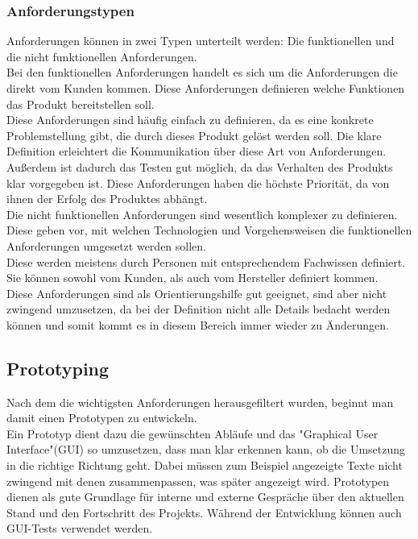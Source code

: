 \documentclass[a4paper,12pt,top=2.5cm,bottom=2.5cm, left=2.5cm, right=2.5cm, numbers=noenddot]{scrartcl}
\begin{document}
\subsubsection{Anforderungstypen}
Anforderungen können in zwei Typen unterteilt werden: Die funktionellen und die nicht funktionellen Anforderungen.
\\Bei den funktionellen Anforderungen handelt es sich um die Anforderungen die direkt vom Kunden kommen. Diese Anforderungen definieren welche Funktionen das Produkt bereitstellen soll.
\\Diese Anforderungen sind häufig einfach zu definieren, da es eine konkrete Problemstellung gibt, die durch dieses Produkt gelöst werden soll. Die klare Definition erleichtert die Kommunikation über diese Art von Anforderungen. Außerdem ist dadurch das Testen gut möglich, da das Verhalten des Produkts klar vorgegeben ist. Diese Anforderungen haben die höchste Priorität, da von ihnen der Erfolg des Produktes abhängt.
\\Die nicht funktionellen Anforderungen sind wesentlich komplexer zu definieren. Diese geben vor, mit welchen Technologien und Vorgehensweisen die funktionellen Anforderungen umgesetzt werden sollen. 
\\Diese werden meistens durch Personen mit entsprechendem Fachwissen definiert. Sie können sowohl vom Kunden, als auch vom Hersteller definiert kommen.
\\Diese Anforderungen sind als Orientierungshilfe gut geeignet, sind aber nicht zwingend umzusetzen, da bei der Definition nicht alle Details bedacht werden können und somit kommt es in diesem Bereich immer wieder zu Änderungen.
\\
\subsection{Prototyping}
Nach dem die wichtigsten Anforderungen herausgefiltert wurden, beginnt man damit einen Prototypen zu entwickeln. 
\\Ein Prototyp dient dazu die gewünschten Abläufe und das "Graphical User Interface"(GUI) so umzusetzen, dass man klar erkennen kann, ob die Umsetzung in die richtige Richtung geht. Dabei müssen zum Beispiel angezeigte Texte nicht zwingend mit denen zusammenpassen, was später angezeigt wird. Prototypen dienen als gute Grundlage für interne und externe Gespräche über den aktuellen Stand und den Fortschritt des Projekts. Während der Entwicklung können auch GUI-Tests verwendet werden.
\end{document}
